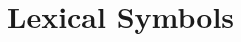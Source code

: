 \documentclass[10pt,fleqn,final]{scrreprt}
\newcommand*{\syntax}[1]{\texttt{#1}}
\newcommand*{\notallowed}{\textbf{not allowed}\xspace}
\newcommand*{\DOL}{\ensuremath{\mathsf{DOL}}\xspace}
\newcommand{\sclause}[1]{\section{#1}}
\newcommand{\nisref}[1]{#1}
\newenvironment{definitions}[0]{\medskip }{}
\begin{document}
\begin{definitions}
%
%
%
%
%

\sclause{Lexical Symbols}


\end{definitions}
\end{document}
